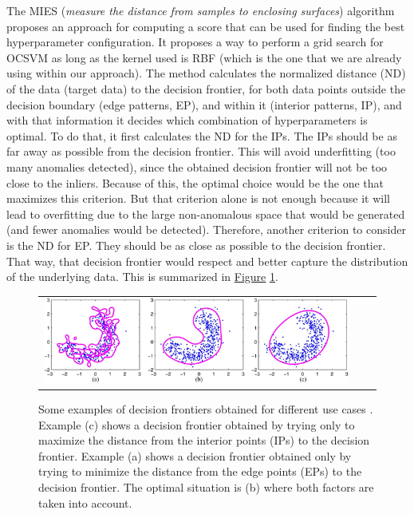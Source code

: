 The MIES (\textit{measure the distance from samples to enclosing surfaces}) algorithm \parencite{xiao2014parameter} proposes an approach for computing a score that can be used for finding the best hyperparameter configuration. It proposes a way to perform a grid search for OCSVM as long as the kernel used is RBF (which is the one that we are already using within our approach). The method calculates the normalized distance (ND) of the data (target data) to the decision frontier, for both data points outside the decision boundary (edge patterns, EP), and within it (interior patterns, IP), and with that information it decides which combination of hyperparameters is optimal.
To do that, it first calculates the ND for the IPs. The IPs should be as far away as possible from the decision frontier. This will avoid underfitting (too many anomalies detected), since the obtained decision frontier will not be too close to the inliers. Because of this, the optimal choice would be the one that maximizes this criterion. But that criterion alone is not enough because it will lead to overfitting due to the large non-anomalous space that would be generated (and fewer anomalies would be detected). Therefore, another criterion to consider is the ND for EP. They should be as close as possible to the decision frontier. That way, that decision frontier would respect and better capture the distribution of the underlying data. This is summarized in \hyperref[fig:ch5-mies-example]{Figure} \ref{fig:ch5-mies-example}.

\begin{figure}[h!]
\centering
  \begin{tabular}{c@{\qquad}c@{\qquad}c}
\includegraphics[width=0.90\columnwidth]{figures/chapter5_LucaComms/MIES_examples.png}
  \end{tabular} 
  \caption{Some examples of decision frontiers obtained for different use cases \parencite{xiao2014parameter}. Example (c) shows a decision frontier obtained by trying only to maximize the distance from the interior points (IPs) to the decision frontier. Example (a) shows a decision frontier obtained only by trying to minimize the distance from the edge points (EPs) to the decision frontier. The optimal situation is (b) where both factors are taken into account. \label{fig:ch5-mies-example}}
\end{figure}

